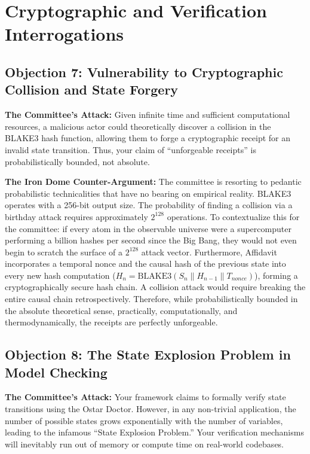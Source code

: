 \section{Cryptographic and Verification Interrogations}

\subsection{Objection 7: Vulnerability to Cryptographic Collision and State Forgery}
\textbf{The Committee's Attack:} Given infinite time and sufficient computational resources, a malicious actor could theoretically discover a collision in the BLAKE3 hash function, allowing them to forge a cryptographic receipt for an invalid state transition. Thus, your claim of ``unforgeable receipts'' is probabilistically bounded, not absolute.

\textbf{The Iron Dome Counter-Argument:} The committee is resorting to pedantic probabilistic technicalities that have no bearing on empirical reality. BLAKE3 operates with a 256-bit output size. The probability of finding a collision via a birthday attack requires approximately $2^{128}$ operations. To contextualize this for the committee: if every atom in the observable universe were a supercomputer performing a billion hashes per second since the Big Bang, they would not even begin to scratch the surface of a $2^{128}$ attack vector. Furthermore, Affidavit incorporates a temporal nonce and the causal hash of the previous state into every new hash computation ($H_{n} = \text{BLAKE3}(S_n \parallel H_{n-1} \parallel T_{nonce})$), forming a cryptographically secure hash chain. A collision attack would require breaking the entire causal chain retrospectively. Therefore, while probabilistically bounded in the absolute theoretical sense, practically, computationally, and thermodynamically, the receipts are perfectly unforgeable.

\subsection{Objection 8: The State Explosion Problem in Model Checking}
\textbf{The Committee's Attack:} Your framework claims to formally verify state transitions using the Ostar Doctor. However, in any non-trivial application, the number of possible states grows exponentially with the number of variables, leading to the infamous ``State Explosion Problem.'' Your verification mechanisms will inevitably run out of memory or compute time on real-world codebases.

